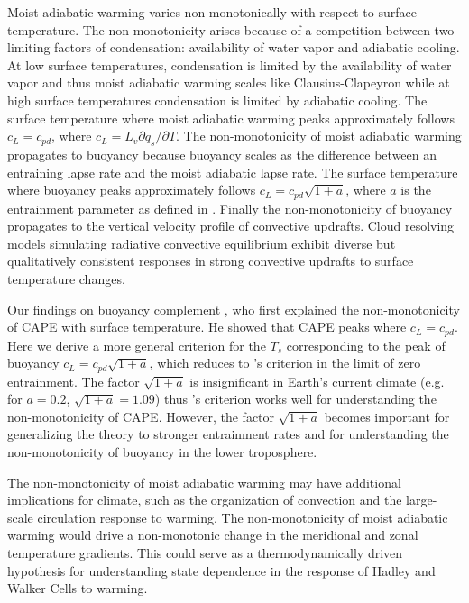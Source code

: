 \documentclass[draft]{ametsocV6.1}
\begin{document}
Moist adiabatic warming varies non-monotonically with respect to surface temperature. The non-monotonicity arises because of a competition between two limiting factors of condensation: availability of water vapor and adiabatic cooling. At low surface temperatures, condensation is limited by the availability of water vapor and thus moist adiabatic warming scales like Clausius-Clapeyron while at high surface temperatures condensation is limited by adiabatic cooling. The surface temperature where moist adiabatic warming peaks approximately follows $c_L = c_{pd}$, where $c_L = L_v \partial q_s / \partial T$. The non-monotonicity of moist adiabatic warming propagates to buoyancy because buoyancy scales as the difference between an entraining lapse rate and the moist adiabatic lapse rate. The surface temperature where buoyancy peaks approximately follows $c_L = c_{pd} \sqrt{1+a}$, where $a$ is the entrainment parameter as defined in \cite{romps2016}. Finally the non-monotonicity of buoyancy propagates to the vertical velocity profile of convective updrafts. Cloud resolving models simulating radiative convective equilibrium exhibit diverse but qualitatively consistent responses in strong convective updrafts to surface temperature changes.

Our findings on buoyancy complement \cite{romps2016}, who first explained the non-monotonicity of CAPE with surface temperature. He showed that CAPE peaks where $c_L = c_{pd}$. Here we derive a more general criterion for the $T_s$ corresponding to the peak of buoyancy $c_L = c_{pd}\sqrt{1+a}$, which reduces to \cite{romps2016}'s criterion in the limit of zero entrainment. The factor $\sqrt{1+a}$ is insignificant in Earth's current climate (e.g. for $a=0.2$, $\sqrt{1+a}=1.09$) thus \cite{romps2016}'s criterion works well for understanding the non-monotonicity of CAPE. However, the factor $\sqrt{1+a}$ becomes important for generalizing the theory to stronger entrainment rates and for understanding the non-monotonicity of buoyancy in the lower troposphere.

The non-monotonicity of moist adiabatic warming may have additional implications for climate, such as the organization of convection and the large-scale circulation response to warming. The non-monotonicity of moist adiabatic warming would drive a non-monotonic change in the meridional and zonal temperature gradients. This could serve as a thermodynamically driven hypothesis for understanding state dependence in the response of Hadley and Walker Cells to warming.
\end{document}

